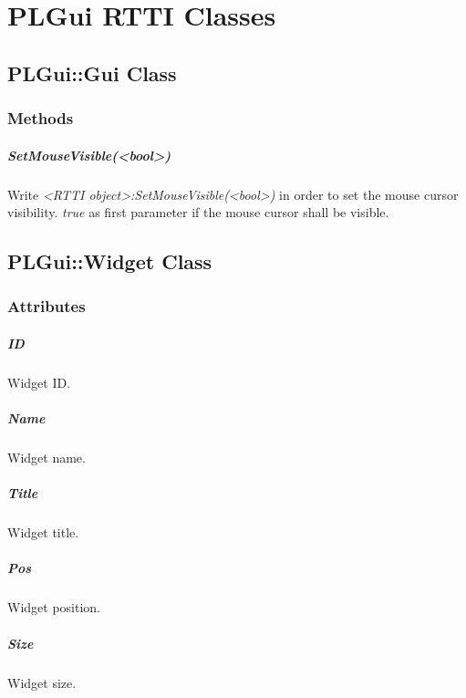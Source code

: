 \chapter{PLGui \ac{RTTI} Classes}




\section{PLGui::Gui Class}


\subsection{Methods}

\paragraph{SetMouseVisible(<bool>)}
Write \emph{<RTTI object>:SetMouseVisible(<bool>)} in order to set the mouse cursor visibility. \emph{true} as first parameter if the mouse cursor shall be visible.




\section{PLGui::Widget Class}


\subsection{Attributes}

\paragraph{ID}
Widget ID.

\paragraph{Name}
Widget name.

\paragraph{Title}
Widget title.

\paragraph{Pos}
Widget position.

\paragraph{Size}
Widget size.

